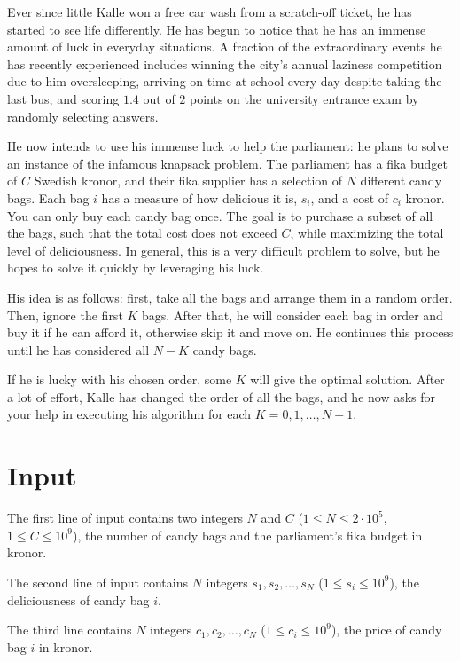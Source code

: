 
\noindent
Ever since little Kalle won a free car wash from a scratch-off ticket, he has started to see life differently.
He has begun to notice that he has an immense amount of luck in everyday situations.
A fraction of the extraordinary events he has recently experienced includes winning the city's annual laziness
competition due to him oversleeping, arriving on time at school every day despite taking the last bus,
and scoring $1.4$ out of $2$ points on the university entrance exam by randomly selecting answers.

He now intends to use his immense luck to help the parliament: he plans to solve an instance of the infamous knapsack problem.
The parliament has a fika budget of $C$ Swedish kronor, and their fika supplier has a selection of $N$ different candy bags.
Each bag $i$ has a measure of how delicious it is, $s_i$, and a cost of $c_i$ kronor. You can only buy each candy bag once.
The goal is to purchase a subset of all the bags, such that the total cost does not exceed $C$, while maximizing the total
level of deliciousness. In general, this is a very difficult problem to solve, but he hopes to solve it quickly by
leveraging his luck.

His idea is as follows: first, take all the bags and arrange them in a random order. Then, ignore the first $K$ bags.
After that, he will consider each bag in order and buy it if he can afford it, otherwise skip it and move on.
He continues this process until he has considered all $N-K$ candy bags.

If he is lucky with his chosen order, some $K$ will give the optimal solution. After a lot of effort, Kalle has changed the order of
all the bags, and he now asks for your help in executing his algorithm for each $K=0,1,\dots,N-1$.

\section*{Input}
The first line of input contains two integers $N$ and $C$ ($1 \leq N \leq 2 \cdot 10^5$, $1 \leq C \leq 10^9$), the
number of candy bags and the parliament's fika budget in kronor.

The second line of input contains $N$ integers $s_1, s_2, \dots, s_N$ ($1 \leq s_i \leq 10^9$), the deliciousness of candy bag $i$.

The third line contains $N$ integers $c_1, c_2, \dots, c_N$ ($1 \leq c_i \leq 10^9$), the price of candy bag $i$ in kronor.

